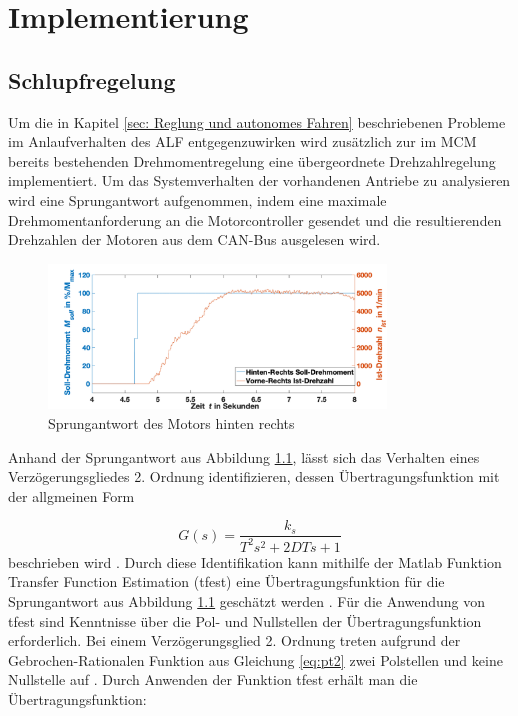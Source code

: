 \chapter{Implementierung}
\label{ch:Implementierung}

	\section{Schlupfregelung}
			\label{sec:Schlupfregelung}
			
			Um die in Kapitel \ref{sec: Reglung und autonomes Fahren} beschriebenen Probleme im Anlaufverhalten des ALF
			entgegenzuwirken wird zusätzlich zur im MCM bereits bestehenden Drehmomentregelung
			eine übergeordnete Drehzahlregelung implementiert. Um das Systemverhalten der vorhandenen Antriebe zu analysieren wird eine Sprungantwort aufgenommen,
			indem eine maximale Drehmomentanforderung an die Motorcontroller
			gesendet und die resultierenden Drehzahlen der Motoren aus dem
			CAN-Bus ausgelesen wird.
			
			
				\begin{figure}[H]
				\centering
				\includegraphics[width=0.8\textwidth]{Bilder/sprungantwort.png}
				\caption{Sprungantwort des Motors hinten rechts}
				\label{fig: Sprungantwort des Motors hinten rechts(BR)}
			\end{figure} 
			
			Anhand der Sprungantwort aus Abbildung \ref{fig: Sprungantwort des Motors hinten rechts(BR)}, lässt sich das Verhalten eines Verzögerungsgliedes 2. Ordnung identifizieren, dessen Übertragungsfunktion mit der allgmeinen Form 
			
			\begin{equation}
					G(s)=\frac{k_s}{T^2s^2+2DTs+1}
					\label{eq:pt2}
			\end{equation}\newline
			beschrieben wird \cite{unbehauen,lunze}. Durch diese Identifikation kann mithilfe der Matlab Funktion Transfer Function Estimation (tfest) eine Übertragungsfunktion für die Sprungantwort aus Abbildung \ref{fig: Sprungantwort des Motors hinten rechts(BR)} geschätzt werden \cite{tfest}. Für die Anwendung von tfest sind Kenntnisse über die Pol- und Nullstellen der Übertragungsfunktion erforderlich. Bei einem Verzögerungsglied 2. Ordnung treten aufgrund der Gebrochen-Rationalen Funktion aus Gleichung \ref{eq:pt2} zwei Polstellen und keine Nullstelle auf \cite{unbehauen}. Durch Anwenden der Funktion tfest erhält man die Übertragungsfunktion: 
			
